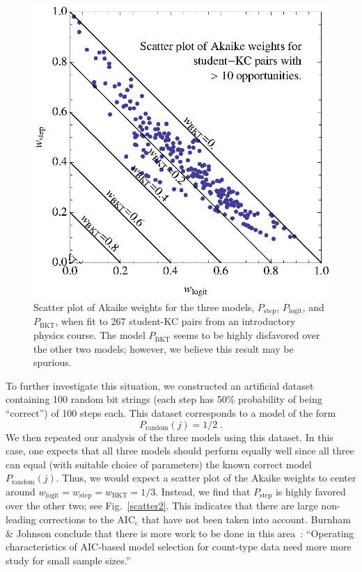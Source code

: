 \documentclass[prodmode,acmtecs]{acmsmall}
\begin{document}
\begin{figure}
  \centering \includegraphics{scatter-weights.eps}
  \caption{Scatter plot of  Akaike weights for the three models, 
   $P_\mathrm{step}$, $P_\mathrm{logit}$, and $P_\mathrm{BKT}$, 
   when fit to 267 student-KC pairs from an introductory physics course.
   The model $P_\mathrm{BKT}$ seems to be highly disfavored over
   the other two models; however, we believe this result
   may be spurious.} \label{scatter1}
\end{figure}

To further investigate this situation, we constructed an
artificial dataset containing 100 random bit strings (each
step has 50\% probability of being ``correct'') of 100 steps each.
This dataset corresponds to a model of the form
%
\begin{equation}
        P_\mathrm{random}(j)=1/2 \; .
\end{equation}
%
We then repeated our analysis of the three models using this
dataset.  In this case, one expects that all three models 
should perform equally well since all three can equal 
(with suitable choice of parameters) the known correct model 
$P_\mathrm{random}(j)$.
Thus, we would expect a scatter plot of the Akaike weights to 
center around 
$w_\mathrm{logit}=w_\mathrm{step}=w_\mathrm{BKT}=1/3$.
Instead, we find that $P_\mathrm{step}$ is highly favored over
the other two; see Fig.~\ref{scatter2}.  
This indicates that there are large non-leading
corrections to the AIC$_\mathrm{c}$ that have not been
taken into account.  Burnham \& Johnson conclude 
that there is more work to be done in this area~\cite[p.~380]{aicbook}: 
``Operating characteristics
of AIC-based model selection for count-type data need more 
more study for small sample sizes.'' 
\end{document}
